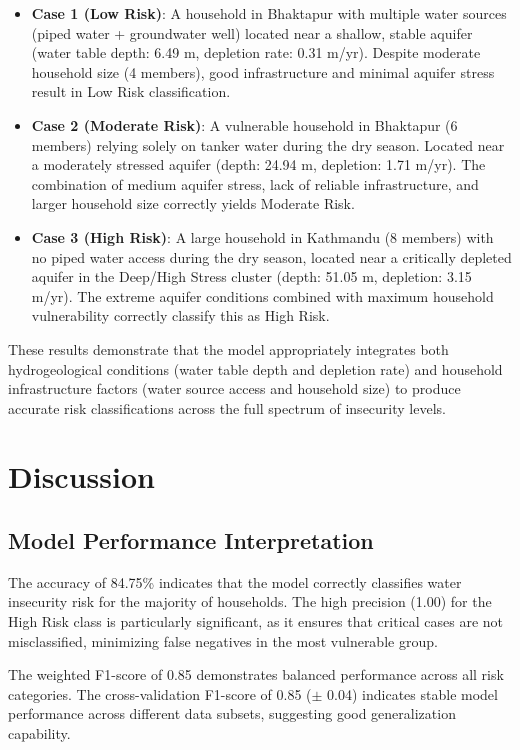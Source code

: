 \documentclass[conference]{IEEEtran}
\begin{document}
\begin{itemize}
\item \textbf{Case 1 (Low Risk)}: A household in Bhaktapur with multiple water sources (piped water + groundwater well) located near a shallow, stable aquifer (water table depth: 6.49 m, depletion rate: 0.31 m/yr). Despite moderate household size (4 members), good infrastructure and minimal aquifer stress result in Low Risk classification.

\item \textbf{Case 2 (Moderate Risk)}: A vulnerable household in Bhaktapur (6 members) relying solely on tanker water during the dry season. Located near a moderately stressed aquifer (depth: 24.94 m, depletion: 1.71 m/yr). The combination of medium aquifer stress, lack of reliable infrastructure, and larger household size correctly yields Moderate Risk.

\item \textbf{Case 3 (High Risk)}: A large household in Kathmandu (8 members) with no piped water access during the dry season, located near a critically depleted aquifer in the Deep/High Stress cluster (depth: 51.05 m, depletion: 3.15 m/yr). The extreme aquifer conditions combined with maximum household vulnerability correctly classify this as High Risk.
\end{itemize}

These results demonstrate that the model appropriately integrates both hydrogeological conditions (water table depth and depletion rate) and household infrastructure factors (water source access and household size) to produce accurate risk classifications across the full spectrum of insecurity levels.

\section{Discussion}

\subsection{Model Performance Interpretation}
The accuracy of 84.75\% indicates that the model correctly classifies water insecurity risk for the majority of households. The high precision (1.00) for the High Risk class is particularly significant, as it ensures that critical cases are not misclassified, minimizing false negatives in the most vulnerable group.

The weighted F1-score of 0.85 demonstrates balanced performance across all risk categories. The cross-validation F1-score of 0.85 ($\pm$ 0.04) indicates stable model performance across different data subsets, suggesting good generalization capability.
\end{document}

